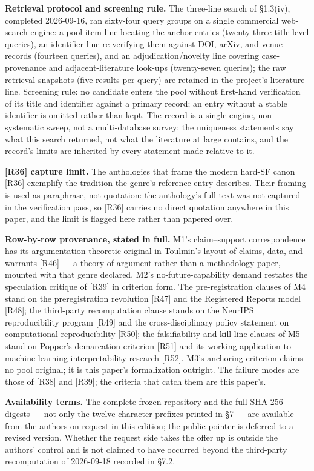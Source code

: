\documentclass[11pt,a4paper]{article}
\begin{document}
\textbf{Retrieval protocol and screening rule.} The three-line search of §1.3(iv), completed 2026-09-16, ran sixty-four query groups on a single commercial web-search engine: a pool-item line locating the anchor entries (twenty-three title-level queries), an identifier line re-verifying them against DOI, arXiv, and venue records (fourteen queries), and an adjudication/novelty line covering case-provenance and adjacent-literature look-ups (twenty-seven queries); the raw retrieval snapshots (five results per query) are retained in the project's literature line. Screening rule: no candidate enters the pool without first-hand verification of its title and identifier against a primary record; an entry without a stable identifier is omitted rather than kept. The record is a single-engine, non-systematic sweep, not a multi-database survey; the uniqueness statements say what this search returned, not what the literature at large contains, and the record's limits are inherited by every statement made relative to it.

\textbf{[R36] capture limit.} The anthologies that frame the modern hard-SF canon [R36] exemplify the tradition the genre's reference entry describes. Their framing is used as paraphrase, not quotation: the anthology's full text was not captured in the verification pass, so [R36] carries no direct quotation anywhere in this paper, and the limit is flagged here rather than papered over.

\textbf{Row-by-row provenance, stated in full.} M1's claim–support correspondence has its argumentation-theoretic original in Toulmin's layout of claims, data, and warrants [R46] — a theory of argument rather than a methodology paper, mounted with that genre declared. M2's no-future-capability demand restates the speculation critique of [R39] in criterion form. The pre-registration clauses of M4 stand on the preregistration revolution [R47] and the Registered Reports model [R48]; the third-party recomputation clause stands on the NeurIPS reproducibility program [R49] and the cross-disciplinary policy statement on computational reproducibility [R50]; the falsifiability and kill-line clauses of M5 stand on Popper's demarcation criterion [R51] and its working application to machine-learning interpretability research [R52]. M3's anchoring criterion claims no pool original; it is this paper's formalization outright. The failure modes are those of [R38] and [R39]; the criteria that catch them are this paper's.

\textbf{Availability terms.} The complete frozen repository and the full SHA-256 digests — not only the twelve-character prefixes printed in §7 — are available from the authors on request in this edition; the public pointer is deferred to a revised version. Whether the request side takes the offer up is outside the authors' control and is not claimed to have occurred beyond the third-party recomputation of 2026-09-18 recorded in §7.2.
\end{document}
